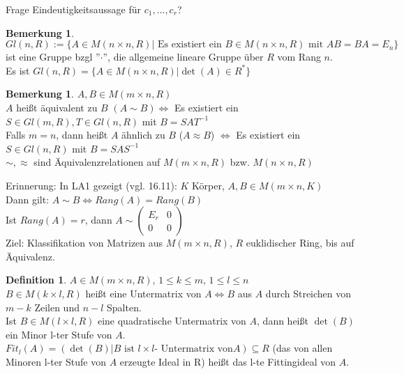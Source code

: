 \documentclass[10pt,a4paper,numbers=endperiod]{scrartcl}
\theoremstyle{definition}
\newtheorem{defi}[satz]{Definition}
\newtheorem{bem}[satz]{Bemerkung}
\begin{document}
Frage Eindeutigkeitsaussage für $c_1, \ldots, c_r$?\\

\begin{bem}
	$Gl(n,R) := \{A \in M(n \times n, R)| \text{ Es existiert ein } B \in M(n \times n, R) \text{ mit } AB = BA = E_n\}$ ist eine Gruppe bzgl ''$\cdot$'', die allgemeine lineare Gruppe über $R$ vom Rang $n$.\\
	Es ist $Gl(n,R) = \{A \in M(n \times n, R)| \det(A) \in R^*\}$
\end{bem}

\begin{bem}
	$A, B \in M(m \times n, R)$\\
	$A$ heißt äquivalent zu $B$ $(A \sim B) \Leftrightarrow$ Es existiert ein $S \in Gl(m, R), T \in Gl(n,R)$ mit $B = SAT^{-1}$\\
	Falls $m = n$, dann heißt $A$ ähnlich zu $B$ ($A \approx B$) $\Leftrightarrow$ Es existiert ein $S \in Gl(n,R)$ mit $B = SAS^{-1}$\\
	$\sim, \approx$ sind Äquivalenzrelationen auf $M(m \times n, R)$ bzw. $M(n \times n, R)$
\end{bem}

Erinnerung: In LA1 gezeigt (vgl. 16.11): $K$ Körper, $A, B \in M(m \times n, K)$\\
Dann gilt: $A \sim B \Leftrightarrow Rang(A) = Rang(B)$\\
Ist $Rang(A) = r$, dann $A \sim \begin{pmatrix}
E_r & 0\\
0 & 0
\end{pmatrix}$\\

Ziel: Klassifikation von Matrizen aus $M(m \times n, R)$, $R$ euklidischer Ring, bis auf Äquivalenz.

\begin{defi}
	$A \in M(m \times n, R)$, $1 \leq k \leq m$, $1 \leq l \leq n$\\
	$B \in M(k \times l, R)$ heißt eine Untermatrix von $A \Leftrightarrow B$ aus $A$ durch Streichen von $m-k$ Zeilen und $n-l$ Spalten.\\
	Ist $B \in M(l \times l, R)$ eine quadratische Untermatrix von $A$, dann heißt $\det(B)$ ein Minor l-ter Stufe von $A$.\\
	$Fit_l(A) = (\det(B)| B \text{ ist $l \times l$- Untermatrix von} A) \subseteq R$ (das von allen Minoren l-ter Stufe von $A$ erzeugte Ideal in R) heißt das l-te Fittingideal von $A$.
\end{defi}
\end{document}

